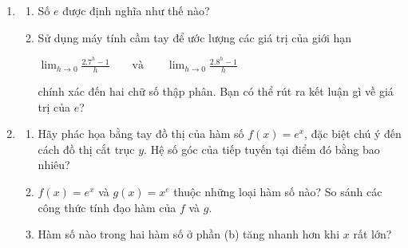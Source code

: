 \vspace{0.8em}
\noindent
\begin{minipage}[t]{0.47\textwidth}
    \begin{enumerate}[label=\textbf{\arabic*.}, leftmargin=1.2em, itemsep=0.9em]
        \item 
        \begin{enumerate}[label=\textbf{(\alph*)}, leftmargin=1.5em, itemsep=0.3em]
            \item Số $e$ được định nghĩa như thế nào?
            \item Sử dụng máy tính cầm tay để ước lượng các giá trị của giới hạn
            \begin{center}
            $\displaystyle \lim_{h \to 0} \frac{2.7^h - 1}{h} \qquad \text{và} \qquad \lim_{h \to 0} \frac{2.8^h - 1}{h}$
            \end{center}
            chính xác đến hai chữ số thập phân. Bạn có thể rút ra kết luận gì về giá trị của $e$?
        \end{enumerate}

        \item 
        \begin{enumerate}[label=\textbf{(\alph*)}, leftmargin=1.5em, itemsep=0.3em]
            \item Hãy phác họa bằng tay đồ thị của hàm số $f(x) = e^x$, đặc biệt chú ý đến cách đồ thị cắt trục $y$. Hệ số góc của tiếp tuyến tại điểm đó bằng bao nhiêu?
            \item $f(x) = e^x$ và $g(x) = x^e$ thuộc những loại hàm số nào? So sánh các công thức tính đạo hàm của $f$ và $g$.
            \item Hàm số nào trong hai hàm số ở phần (b) tăng nhanh hơn khi $x$ rất lớn?
        \end{enumerate}
    \end{enumerate}
\end{minipage}%
\hfill
